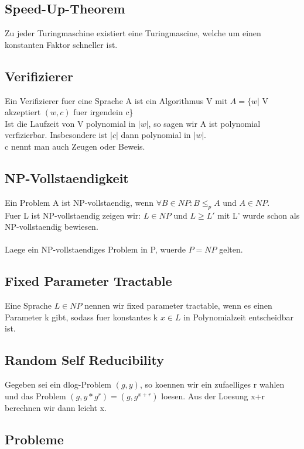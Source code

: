 \documentclass[a4paper]{scrreprt}
\begin{document}
\subsection{Speed-Up-Theorem}
Zu jeder Turingmaschine existiert eine Turingmascine, welche um einen konstanten Faktor schneller ist.

\subsection{Verifizierer}
Ein Verifizierer fuer eine Sprache A ist ein Algorithmus V mit $A = \{w|$ V akzeptiert $(w,c)$ fuer irgendein c\}\\
Ist die Laufzeit von V polynomial in $|w|$, so sagen wir A ist polynomial verfizierbar. Insbesondere ist $|c|$ dann polynomial in $|w|$.\\
c nennt man auch Zeugen oder Beweis.

\subsection{NP-Vollstaendigkeit}
Ein Problem A ist NP-vollstaendig, wenn $\forall B \in NP: B \le_p A$ und $A \in NP$.\\
Fuer L ist NP-vollstaendig zeigen wir: $L \in NP$ und $L \ge L'$ mit L' wurde schon als NP-vollstaendig bewiesen.\\\\
Laege ein NP-vollstaendiges Problem in P, wuerde $P = NP$ gelten.\\

\subsection{Fixed Parameter Tractable}
Eine Sprache $L \in NP$ nennen wir fixed parameter tractable, wenn es einen Parameter k gibt, sodass fuer konstantes k $x \in L$ in Polynomialzeit entscheidbar ist.

\subsection{Random Self Reducibility}
Gegeben sei ein dlog-Problem $(g, y)$, so koennen wir ein zufaelliges r wahlen und das Problem $(g, y*g^r) = (g, g^{x+r})$ loesen. Aus der Loesung x+r berechnen wir dann leicht x.




\subsection{Probleme}
\end{document}
